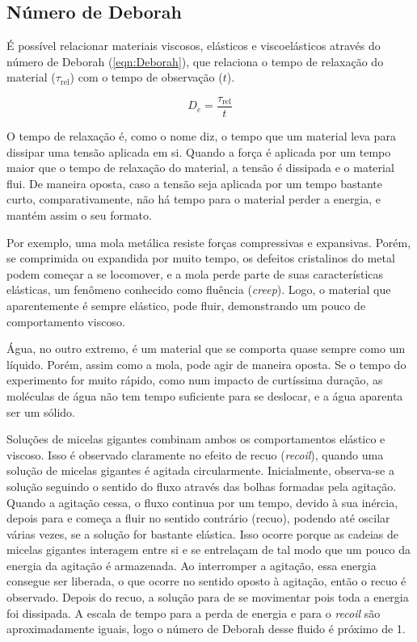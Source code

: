 		\subsection{Número de Deborah} 
		
		É possível relacionar materiais viscosos, elásticos e viscoelásticos através do número de Deborah (\autoref{eqn:Deborah})\cite{Goodwin2008}, que relaciona o tempo de relaxação do material (\(\tau_{\mathrm{rel}}\)) com o tempo de observação (\(t\)).  
		
		\begin{equation}
			D_e = \dfrac{\tau_{\text{rel}}}{t}
			\label{eqn:Deborah}
		\end{equation}
		
		O tempo de relaxação é, como o nome diz, o tempo que um material leva para dissipar uma tensão aplicada em si. Quando a força é aplicada por um tempo maior que o tempo de relaxação do material, a tensão é dissipada e o material flui. De maneira oposta, caso a tensão seja aplicada por um tempo bastante curto, comparativamente, não há tempo para o material perder a energia, e mantém assim o seu formato.
		
		Por exemplo, uma mola metálica resiste forças compressivas e expansivas. Porém, se comprimida ou expandida por muito tempo, os defeitos cristalinos do metal podem começar a se locomover, e a mola perde parte de suas características elásticas, um fenômeno conhecido como fluência (\emph{creep}). Logo, o material que aparentemente é sempre elástico, pode fluir, demonstrando um pouco de comportamento viscoso.\cite{Crossland1973, Schleichert2017}
				
		Água, no outro extremo, é um material que se comporta quase sempre como um líquido. Porém, assim como a mola, pode agir de maneira oposta. Se o tempo do experimento for muito rápido, como num impacto de curtíssima duração, as moléculas de água não tem tempo suficiente para se deslocar, e a água aparenta ser um sólido.\cite{Goodwin2008}
		
		Soluções de micelas gigantes combinam ambos os comportamentos elástico e viscoso.\cite{Pilpel1966, Hoffmann1982a}  Isso é observado claramente no efeito de recuo (\emph{recoil}),  quando uma solução de micelas gigantes é agitada circularmente.\cite{Hoffmann1988a} Inicialmente, observa-se a solução seguindo o sentido do fluxo através das bolhas formadas pela agitação. Quando a agitação cessa, o fluxo continua por um tempo, devido à sua inércia, depois para e começa a fluir no sentido contrário (recuo), podendo até oscilar várias vezes, se a solução for bastante elástica. Isso ocorre porque as cadeias de micelas gigantes interagem entre si e se entrelaçam de tal modo que um pouco da energia da agitação é armazenada. Ao interromper a agitação, essa energia consegue ser liberada, o que ocorre no sentido oposto à agitação, então o recuo é observado. Depois do recuo, a solução para de se movimentar pois toda a energia foi dissipada. A escala de tempo para a perda de energia e para o \emph{recoil} são aproximadamente iguais, logo o número de Deborah desse fluido é próximo de 1.
		
